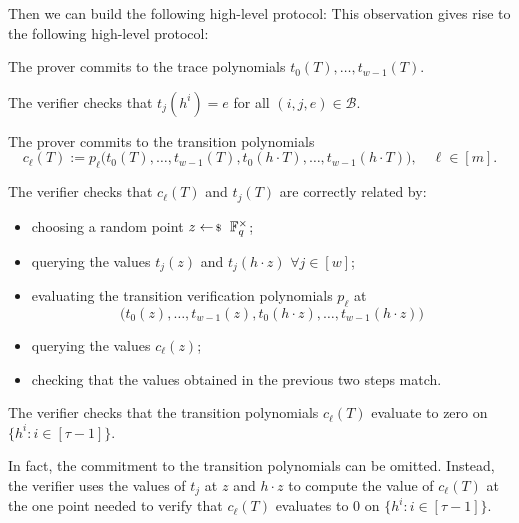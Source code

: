 \documentclass[../../book]{subfiles}
\begin{document}
Then we can build the following high-level protocol:
This observation gives rise to the following high-level protocol:
\begin{algoen}
  \item The prover commits to the trace polynomials $t_0(T), \ldots, t_{w-1}(T)$.
  \item The verifier checks that $t_j(h^i) = e$ for all $(i,j,e) \in \mathcal{B}$.
  \item The prover commits to the transition polynomials
  \begin{equation*}
    c_\ell(T) := p_\ell\big(t_0(T), \ldots, t_{w-1}(T), t_0(h \cdot T), \ldots, t_{w-1}(h \cdot T)\big),
    \quad \ell \in [m].
  \end{equation*}
  \item The verifier checks that $c_\ell(T)$ and $t_j(T)$ are correctly related by:
  \begin{itemize}
    \item choosing a random point $z \leftarrowS \mathbb{F}_q^{\times}$;
    \item querying the values $t_j(z)$ and $t_j(h \cdot z)$ $\forall j \in [w]$;
    \item evaluating the transition verification polynomials $p_\ell$ at
    \begin{equation*}
      \big(t_0(z), \ldots, t_{w-1}(z), t_0(h \cdot z), \ldots, t_{w-1}(h \cdot z)\big)
    \end{equation*}
    \item querying the values $c_\ell(z)$;
    \item checking that the values obtained in the previous two steps match.
  \end{itemize}
  \item The verifier checks that the transition polynomials $c_\ell(T)$ evaluate to zero on
  $\{h^i : i \in [\tau-1]\}$.
\end{algoen}

In fact, the commitment to the transition polynomials can be omitted. Instead, the verifier uses
the values of $t_j$ at $z$ and $h \cdot z$ to compute the value of $c_\ell(T)$ at the one point
needed to verify that $c_\ell(T)$ evaluates to $0$ on $\{h^i : i \in [\tau-1]\}$.
\end{document}
